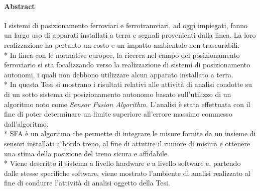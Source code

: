 \paragraph{Abstract}
I sistemi di posizionamento ferroviari e ferrotramviari, ad oggi impiegati, fanno un largo uso di apparati installati a terra e segnali provenienti dalla linea. La loro realizzazione ha pertanto un costo e un impatto ambientale non trascurabili.\\*
In linea con le normative europee, la ricerca nel campo del posizionamento ferroviario si sta focalizzando verso la realizzazione di sistemi di posizionamento autonomi, i quali non debbono utilizzare alcun apparato installato a terra.\\*
In questa Tesi si mostrano i risultati relativi alle attivit\`a di analisi condotte su di un sotto sistema di posizionamento autonomo basato sull'utilizzo di un algoritmo noto come \emph{Sensor Fusion Algorithm}. L'analisi \`e stata effettuata con il fine di poter determinare un limite superiore all'errore massimo commesso dall'algoritmo.\\*
SFA \`e un algoritmo che permette di integrare le misure fornite da un insieme di sensori installati a bordo treno, al fine di attutire il rumore di misura e ottenere una stima della posizione del treno sicura e affidabile.\\*
Viene descritto il sistema a livello hardware e a livello software e, partendo dalle stesse specifiche software, viene mostrato l'ambiente di analisi realizzato al fine di condurre l'attivit\`a di analisi oggetto della Tesi.